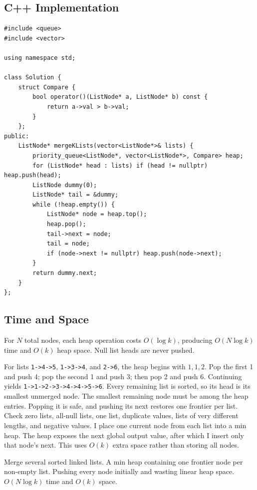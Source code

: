 \subsection{C++ Implementation}
\begin{lstlisting}[style=compactcode,caption={Complete C++ solution: Merge K Sorted Lists}]
#include <queue>
#include <vector>

using namespace std;

class Solution {
    struct Compare {
        bool operator()(ListNode* a, ListNode* b) const {
            return a->val > b->val;
        }
    };
public:
    ListNode* mergeKLists(vector<ListNode*>& lists) {
        priority_queue<ListNode*, vector<ListNode*>, Compare> heap;
        for (ListNode* head : lists) if (head != nullptr) heap.push(head);
        ListNode dummy(0);
        ListNode* tail = &dummy;
        while (!heap.empty()) {
            ListNode* node = heap.top();
            heap.pop();
            tail->next = node;
            tail = node;
            if (node->next != nullptr) heap.push(node->next);
        }
        return dummy.next;
    }
};
\end{lstlisting}

\subsection{Time and Space}
For \(N\) total nodes, each heap operation costs \(O(\log k)\), producing
\(O(N\log k)\) time and \(O(k)\) heap space. Null list heads are never pushed.

\lessonexpansion
  {For lists \texttt{1->4->5}, \texttt{1->3->4}, and \texttt{2->6}, the heap
   begins with \(1,1,2\). Pop the first 1 and push 4; pop the second 1 and push
   3; then pop 2 and push 6. Continuing yields
   \texttt{1->1->2->3->4->4->5->6}.}
  {Every remaining list is sorted, so its head is its smallest unmerged node.
   The smallest remaining node must be among the heap entries. Popping
   it is safe, and pushing its next restores one frontier per list.}
  {Check zero lists, all-null lists, one list, duplicate values, lists of very
   different lengths, and negative values.}
  {I place one current node from each list into a min heap. The heap exposes
   the next global output value, after which I insert only that node's
   next. This uses \(O(k)\) extra space rather than storing all nodes.}

\chaptercheckpoint
  {Merge several sorted linked lists.}
  {A min heap containing one frontier node per non-empty list.}
  {Pushing every node initially and wasting linear heap space.}
  {$O(N\log k)$ time and $O(k)$ space.}


